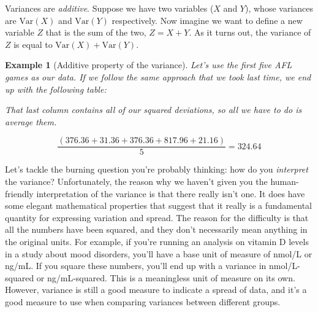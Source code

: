 \documentclass[
  11pt,
]{book}
\theoremstyle{indenteddefinition}
\theoremstyle{indenteddefinition}
\newtheorem{example}{Example}[chapter]
\theoremstyle{definition}
\theoremstyle{definition}
\theoremstyle{remark}
\begin{document}
Variances are \emph{additive}. Suppose we have two variables (\(X\) and \(Y\)), whose variances are \(\mbox{Var}(X)\) and \(\mbox{Var}(Y)\) respectively. Now imagine we want to define a new variable \(Z\) that is the sum of the two, \(Z = X+Y\). As it turns out, the variance of \(Z\) is equal to \(\mbox{Var}(X) + \mbox{Var}(Y)\).

\begin{example}[Additive property of the variance]
\protect\hypertarget{exm:exVarAddit}{}\label{exm:exVarAddit}Let's use the first five AFL games as our data. If we follow the same approach that we took last time, we end up with the following table:

\begin{table}[H]
\centering
{}
\end{table}

That last column contains all of our squared deviations, so all we have to do is average them.

\[
\frac{( 376.36 + 31.36 + 376.36 + 817.96 + 21.16 )}{5} = 324.64
\]
\end{example}

Let's tackle the burning question you're probably thinking: how do you \emph{interpret} the variance? Unfortunately, the reason why we haven't given you the human-friendly interpretation of the variance is that there really isn't one. It does have some elegant mathematical properties that suggest that it really is a fundamental quantity for expressing variation and spread. The reason for the difficulty is that all the numbers have been squared, and they don't necessarily mean anything in the original units. For example, if you're running an analysis on vitamin D levels in a study about mood disorders, you'll have a base unit of measure of nmol/L or ng/mL. If you square these numbers, you'll end up with a variance in nmol/L-squared or ng/mL-squared. This is a meaningless unit of measure on its own. However, variance is still a good measure to indicate a spread of data, and it's a good measure to use when comparing variances between different groups.
\end{document}
